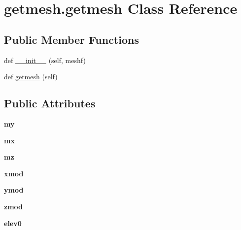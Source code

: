 \hypertarget{classgetmesh_1_1getmesh}{}\section{getmesh.\+getmesh Class Reference}
\label{classgetmesh_1_1getmesh}
\subsection*{Public Member Functions}
\begin{DoxyCompactItemize}
\item 
def \hyperlink{classgetmesh_1_1getmesh_a67514ad6c427b8da4c6bbd1bc58ecb08}{\+\_\+\+\_\+init\+\_\+\+\_\+} (self, meshf)
\item 
def \hyperlink{classgetmesh_1_1getmesh_a82dfe6bc8ed8d0321b58232d1e9d1a6a}{getmesh} (self)
\end{DoxyCompactItemize}
\subsection*{Public Attributes}
\begin{DoxyCompactItemize}
\item 
\mbox{\label{classgetmesh_1_1getmesh_ab6dddec5512ff1178c469ea6c7cfe6fc}} 
{\bfseries my}
\item 
\mbox{\label{classgetmesh_1_1getmesh_acdc9b1a8220f012d11421717fc9a0a28}} 
{\bfseries mx}
\item 
\mbox{\label{classgetmesh_1_1getmesh_a47ea007567adae3a5effc154b7525818}} 
{\bfseries mz}
\item 
\mbox{\label{classgetmesh_1_1getmesh_a03ec19aa1dcebc6aef2d88903fe7249b}} 
{\bfseries xmod}
\item 
\mbox{\label{classgetmesh_1_1getmesh_a6a0d2258910785adb665501564f692b8}} 
{\bfseries ymod}
\item 
\mbox{\label{classgetmesh_1_1getmesh_a67772e8ffbbfd02b83cb20c29e581b08}} 
{\bfseries zmod}
\item 
\mbox{\label{classgetmesh_1_1getmesh_a165fd1b81efbbb79881874fa1d7a1682}} 
{\bfseries elev0}
\end{DoxyCompactItemize}


